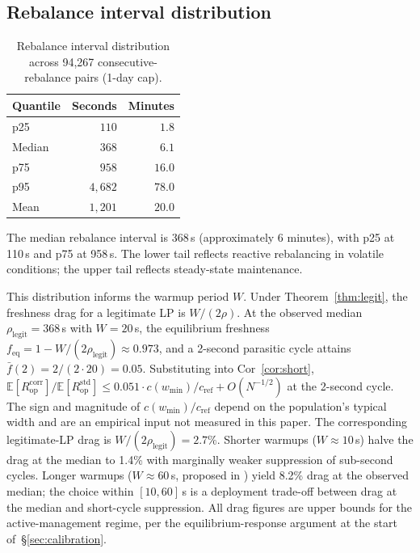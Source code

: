 \documentclass[11pt,a4paper]{article}
\theoremstyle{definition}
\theoremstyle{plain}
\theoremstyle{remark}
\begin{document}
\subsection{Rebalance interval distribution}\label{sec:calinterval}

\begin{table}[H]
\centering
\caption{Rebalance interval distribution across 94{,}267 consecutive-rebalance pairs (1-day cap).}
\label{tab:interval}
\begin{tabular}{@{}lrr@{}}
\toprule
Quantile & Seconds & Minutes \\
\midrule
p25 & $110$ & $1.8$ \\
Median & $368$ & $6.1$ \\
p75 & $958$ & $16.0$ \\
p95 & $4{,}682$ & $78.0$ \\
Mean & $1{,}201$ & $20.0$ \\
\bottomrule
\end{tabular}
\end{table}

The median rebalance interval is 368\,s (approximately 6 minutes), with p25 at 110\,s and p75 at 958\,s. The lower tail reflects reactive rebalancing in volatile conditions; the upper tail reflects steady-state maintenance.

This distribution informs the warmup period $W$. Under Theorem~\ref{thm:legit}, the freshness drag for a legitimate LP is $W/(2\rho)$. At the observed median $\rho_{\text{legit}} = 368$\,s with $W = 20$\,s, the equilibrium freshness $f_{\text{eq}} = 1 - W/(2\rho_{\text{legit}}) \approx 0.973$, and a 2-second parasitic cycle attains $\bar f(2) = 2/(2 \cdot 20) = 0.05$. Substituting into Cor~\ref{cor:short}, $\mathbb{E}[R^{\text{corr}}_{\text{op}}]/\mathbb{E}[R^{\text{std}}_{\text{op}}] \leq 0.051 \cdot c(w_{\min})/c_{\text{ref}} + O(N^{-1/2})$ at the 2-second cycle. The sign and magnitude of $c(w_{\min})/c_{\text{ref}}$ depend on the population's typical width and are an empirical input not measured in this paper. The corresponding legitimate-LP drag is $W/(2\rho_{\text{legit}}) = 2.7\%$. Shorter warmups ($W \approx 10$\,s) halve the drag at the median to 1.4\% with marginally weaker suppression of sub-second cycles. Longer warmups ($W \approx 60$\,s, proposed in \cite{ryan2026c}) yield 8.2\% drag at the observed median; the choice within $[10, 60]$\,s is a deployment trade-off between drag at the median and short-cycle suppression. All drag figures are upper bounds for the active-management regime, per the equilibrium-response argument at the start of~\S\ref{sec:calibration}.
\end{document}
